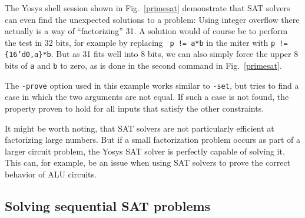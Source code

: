 \documentclass[9pt,technote,a4paper]{IEEEtran}
\begin{document}
The Yosys shell session shown in Fig.~\ref{primesat} demonstrate that SAT
solvers can even find the unexpected solutions to a problem: Using integer
overflow there actually is a way of "`factorizing"' 31. A solution would of
course be to perform the test in 32 bits, for example by replacing {\tt
p != a*b} in the miter with {\tt p != \{16'd0,a\}*b}. But as 31 fits well into
8 bits, we can also simply force the upper 8 bits of {\tt a} and {\tt b}
to zero, as is done in the second command in Fig.~\ref{primesat}.

The {\tt -prove} option used in this example works similar to {\tt -set}, but
tries to find a case in which the two arguments are not equal. If such a case is
not found, the property proven to hold for all inputs that satisfy the other
constraints.

It might be worth noting, that SAT solvers are not particularly efficient at
factorizing large numbers. But if a small factorization problem occurs as
part of a larger circuit problem, the Yosys SAT solver is perfectly capable
of solving it. This can, for example, be an issue when using SAT solvers
to prove the correct behavior of ALU circuits.

\subsection{Solving sequential SAT problems}
\end{document}
